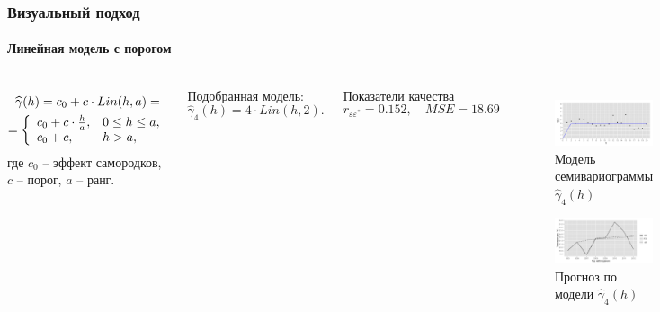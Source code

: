 \documentclass[10pt,pdf,aspectratio=169,hyperref={unicode}]{beamer}
\begin{document}
\begin{frame}
  \frametitle{Визуальный подход}
  \framesubtitle{Линейная модель с порогом}
  \begin{columns}[c]
  \column{3in}
  \begin{equation}\begin{gathered}
  \label{eq:linsill}
    \widehat{\gamma}(h) = c_0 + c \cdot Lin(h, a) = \\
    = \left\{
    \begin{array}{l l}
     c_0 + c \cdot \frac{h}{a}, & 0 \leq h \leq a, \\
     c_0 + c, & h > a,
    \end{array} \right.
  \end{gathered}\end{equation}
  где $ c_0 $ -- эффект самородков, $ c $ -- порог, $ a $ -- ранг.

  \vspace{0.5em}

  Подобранная модель:
  \begin{equation}
  \label{eq:gamma4}
    \widehat{\gamma}_4(h) = 4 \cdot Lin(h, 2).
  \end{equation}

  Показатели качества
  \begin{equation*}
    r_{\varepsilon\varepsilon^{*}} = 0.152, \quad MSE = 18.69
  \end{equation*}

  \column{3in}
  \vspace{-14.5pt}
  \begin{figure}[H]
    \includegraphics[width=0.9\linewidth]{../../figures/variogram/lin-fit-adapt-modeled.png} \\
    \caption{Модель семивариограммы $\widehat{\gamma}_4(h)$}
    \includegraphics[width=0.9\linewidth]{../../figures/variogram/lin-fit-adapt-cross-prediction.png}
    \caption{Прогноз по модели $\widehat{\gamma}_4(h)$}
  \end{figure}
  \end{columns}
\end{frame}
\end{document}
